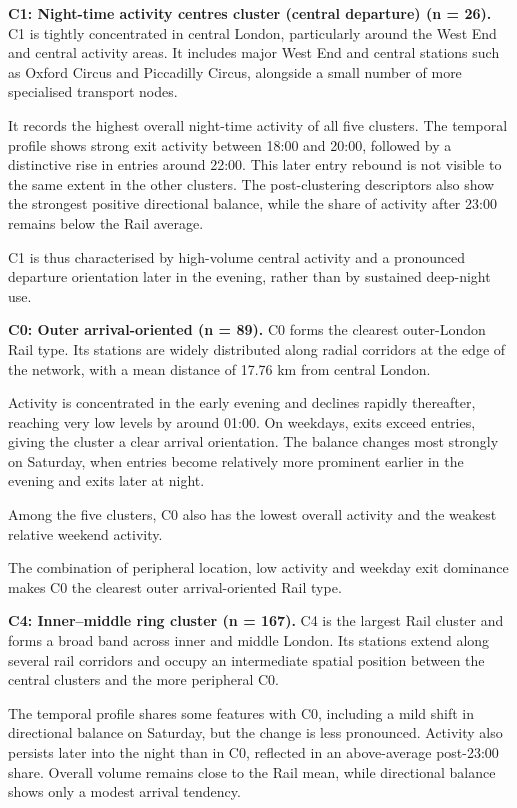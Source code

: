 \textbf{C1: Night-time activity centres cluster (central departure) (n = 26).} C1 is tightly concentrated in central London, particularly around the West End and central activity areas. It includes major West End and central stations such as Oxford Circus and Piccadilly Circus, alongside a small number of more specialised transport nodes.

It records the highest overall night-time activity of all five clusters. The temporal profile shows strong exit activity between 18:00 and 20:00, followed by a distinctive rise in entries around 22:00. This later entry rebound is not visible to the same extent in the other clusters. The post-clustering descriptors also show the strongest positive directional balance, while the share of activity after 23:00 remains below the Rail average.

C1 is thus characterised by high-volume central activity and a pronounced departure orientation later in the evening, rather than by sustained deep-night use.

\textbf{C0: Outer arrival-oriented (n = 89).} C0 forms the clearest outer-London Rail type. Its stations are widely distributed along radial corridors at the edge of the network, with a mean distance of 17.76 km from central London.

Activity is concentrated in the early evening and declines rapidly thereafter, reaching very low levels by around 01:00. On weekdays, exits exceed entries, giving the cluster a clear arrival orientation. The balance changes most strongly on Saturday, when entries become relatively more prominent earlier in the evening and exits later at night.

Among the five clusters, C0 also has the lowest overall activity and the weakest relative weekend activity.

The combination of peripheral location, low activity and weekday exit dominance makes C0 the clearest outer arrival-oriented Rail type.

\textbf{C4: Inner--middle ring cluster (n = 167).} C4 is the largest Rail cluster and forms a broad band across inner and middle London. Its stations extend along several rail corridors and occupy an intermediate spatial position between the central clusters and the more peripheral C0.

The temporal profile shares some features with C0, including a mild shift in directional balance on Saturday, but the change is less pronounced. Activity also persists later into the night than in C0, reflected in an above-average post-23:00 share. Overall volume remains close to the Rail mean, while directional balance shows only a modest arrival tendency.

